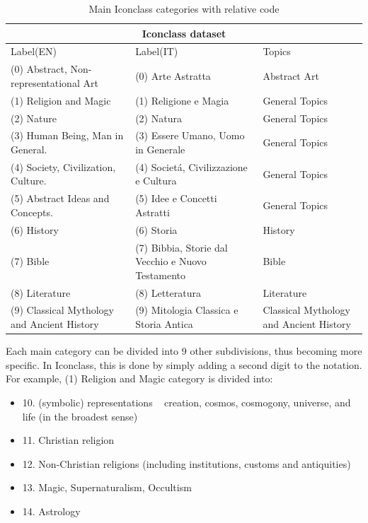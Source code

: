 \documentclass[epsfig,a4paper,12pt,titlepage]{book}
\begin{document}
\begin{table}[h!]
 \centering
\begin{adjustbox}{width=\textwidth}
\begin{tabular}{|p{4.5cm}||p{4.5cm}|p{5.0cm}|} \hline
  \hline
  \multicolumn{3}{|c|}{Iconclass dataset} \\
  \hline
  Label(EN) & Label(IT)  & Topics \\ \hline
    (0) Abstract, Non-representational Art& (0) Arte Astratta & Abstract Art \\ \hline
    (1) Religion and Magic& (1) Religione e Magia & General Topics \\ \hline
    (2) Nature& (2) Natura & General Topics \\ \hline
    (3) Human Being, Man in General.& (3) Essere Umano, Uomo in Generale & General Topics \\ \hline
    (4) Society, Civilization, Culture.& (4) Societ\'a, Civilizzazione e Cultura & General Topics \\ \hline
    (5) Abstract Ideas and Concepts.& (5) Idee e Concetti Astratti&General Topics \\ \hline
    (6) History & (6) Storia & History \\ \hline
    (7) Bible & (7) Bibbia, Storie dal Vecchio e Nuovo Testamento&Bible \\ \hline
    (8) Literature & (8) Letteratura&Literature \\ \hline
    (9) Classical Mythology and Ancient History & (9) Mitologia Classica e Storia Antica & Classical Mythology and Ancient History \\ \hline  \hline
\end{tabular}
\end{adjustbox}
    \caption{Main Iconclass categories with relative code}
		\label{tab:man_iconclass}       %
\end{table}

Each main category can be divided into 9 other subdivisions, thus becoming more specific. In Iconclass, this is done by simply adding a second digit to the notation. For example, (1) Religion and Magic category is divided into:
\begin{itemize}
    \item 10. (symbolic) representations ~ creation, cosmos, cosmogony, universe, and life (in the broadest sense)
    \item 11. Christian religion
    \item 12. Non-Christian religions (including institutions, customs and antiquities)    
    \item 13. Magic, Supernaturalism, Occultism
    \item 14. Astrology 
\end{itemize}
\end{document}
